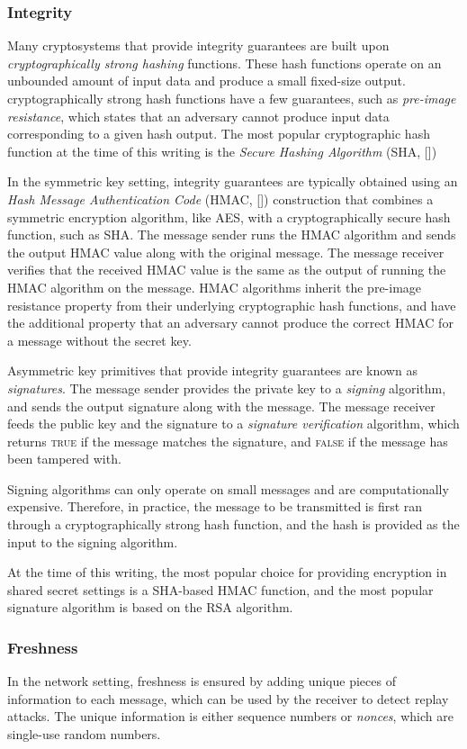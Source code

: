 \subsubsection{Integrity}

Many cryptosystems that provide integrity guarantees are built upon
\textit{cryptographically strong hashing} functions. These hash functions
operate on an unbounded amount of input data and produce a small fixed-size
output. cryptographically strong hash functions have a few guarantees, such as
\textit{pre-image resistance}, which states that an adversary cannot produce
input data corresponding to a given hash output. The most popular cryptographic
hash function at the time of this writing is the
\textit{Secure Hashing Algorithm} (SHA, [])

In the symmetric key setting, integrity guarantees are typically obtained using
an \textit{Hash Message Authentication Code} (HMAC, []) construction that
combines a symmetric encryption algorithm, like AES, with a cryptographically
secure hash function, such as SHA. The message sender runs the HMAC algorithm
and sends the output HMAC value along with the original message. The message
receiver verifies that the received HMAC value is the same as the output of
running the HMAC algorithm on the message. HMAC algorithms inherit the
pre-image resistance property from their underlying cryptographic hash
functions, and have the additional property that an adversary cannot produce
the correct HMAC for a message without the secret key.

Asymmetric key primitives that provide integrity guarantees are known as
\textit{signatures}. The message sender provides the private key to a
\textit{signing} algorithm, and sends the output signature along with the
message. The message receiver feeds the public key and the signature to a
\textit{signature verification} algorithm, which returns \textsc{true} if the
message matches the signature, and \textsc{false} if the message has been
tampered with.

Signing algorithms can only operate on small messages and are computationally
expensive. Therefore, in practice, the message to be transmitted is first ran
through a cryptographically strong hash function, and the hash is provided as
the input to the signing algorithm.

At the time of this writing, the most popular choice for providing encryption
in shared secret settings is a SHA-based HMAC function, and the most popular
signature algorithm is based on the RSA algorithm.


\subsubsection{Freshness}

In the network setting, freshness is ensured by adding unique pieces of
information to each message, which can be used by the receiver to detect replay
attacks. The unique information is either sequence numbers or \textit{nonces},
which are single-use random numbers.
